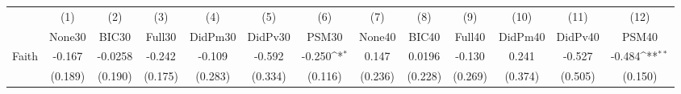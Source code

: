 {
\def\sym#1{\ifmmode^{#1}\else\(^{#1}\)\fi}
\begin{tabular}{l*{12}{c}}
\toprule
            &\multicolumn{1}{c}{(1)}&\multicolumn{1}{c}{(2)}&\multicolumn{1}{c}{(3)}&\multicolumn{1}{c}{(4)}&\multicolumn{1}{c}{(5)}&\multicolumn{1}{c}{(6)}&\multicolumn{1}{c}{(7)}&\multicolumn{1}{c}{(8)}&\multicolumn{1}{c}{(9)}&\multicolumn{1}{c}{(10)}&\multicolumn{1}{c}{(11)}&\multicolumn{1}{c}{(12)}\\
            &\multicolumn{1}{c}{None30}&\multicolumn{1}{c}{BIC30}&\multicolumn{1}{c}{Full30}&\multicolumn{1}{c}{DidPm30}&\multicolumn{1}{c}{DidPv30}&\multicolumn{1}{c}{PSM30}&\multicolumn{1}{c}{None40}&\multicolumn{1}{c}{BIC40}&\multicolumn{1}{c}{Full40}&\multicolumn{1}{c}{DidPm40}&\multicolumn{1}{c}{DidPv40}&\multicolumn{1}{c}{PSM40}\\
\midrule
Faith       &      -0.167         &     -0.0258         &      -0.242         &      -0.109         &      -0.592         &      -0.250\sym{*}  &       0.147         &      0.0196         &      -0.130         &       0.241         &      -0.527         &      -0.484\sym{**} \\
            &     (0.189)         &     (0.190)         &     (0.175)         &     (0.283)         &     (0.334)         &     (0.116)         &     (0.236)         &     (0.228)         &     (0.269)         &     (0.374)         &     (0.505)         &     (0.150)         \\
\bottomrule
\end{tabular}
}

